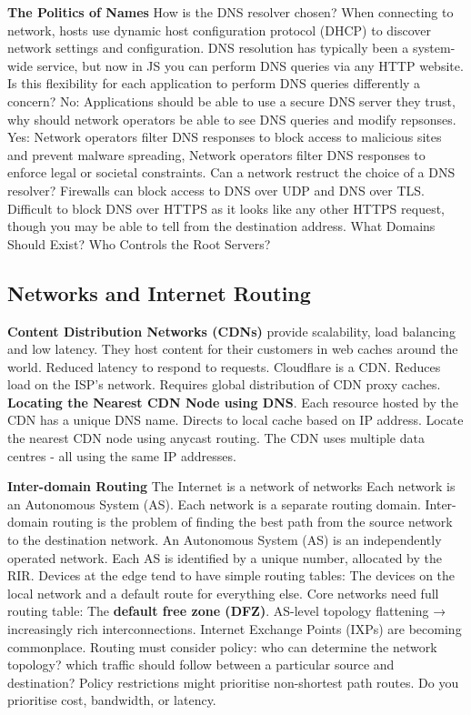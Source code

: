\documentclass{article}
\begin{document}
\vspace{\baselineskip}
\textbf{The Politics of Names}
How is the DNS resolver chosen? When connecting to network, hosts use dynamic host configuration protocol (DHCP)
to discover network settings and configuration.
DNS resolution has typically been a system-wide service, but now in JS you can perform DNS queries via any HTTP website.
Is this flexibility for each application to perform DNS queries differently a concern?
No: Applications should be able to use a secure DNS server they trust, why should network operators be able to see DNS queries and modify repsonses.
Yes: Network operators filter DNS responses to block access to malicious sites and prevent malware spreading,
Network operators filter DNS responses to enforce legal or societal constraints.
Can a network restruct the choice of a DNS resolver?
Firewalls can block access to DNS over UDP and DNS over TLS\@.
Difficult to block DNS over HTTPS as it looks like any other HTTPS request, though you may be able to tell from the destination address.
What Domains Should Exist?
Who Controls the Root Servers?

\clearpage


\subsection*{Networks and Internet Routing}

\textbf{Content Distribution Networks (CDNs)} provide scalability, load balancing and low latency.
They host content for their customers in web caches around the world.
Reduced latency to respond to requests.
Cloudflare is a CDN\@.
Reduces load on the ISP's network.
Requires global distribution of CDN proxy caches.
\textbf{Locating the Nearest CDN Node using DNS}.
Each resource hosted by the CDN has a unique DNS name.
Directs to local cache based on IP address.
Locate the nearest CDN node using anycast routing.
The CDN uses multiple data centres {-} all using the same IP addresses.

\vspace{\baselineskip}
\textbf{Inter-domain Routing}
The Internet is a network of networks
Each network is an Autonomous System (AS).
Each network is a separate routing domain.
Inter-domain routing is the problem of finding the best path from the source network to the destination network.
An Autonomous System (AS) is an independently operated network.
Each AS is identified by a unique number, allocated by the RIR\@.
Devices at the edge tend to have simple routing tables: The devices on the local network and a default route for everything else.
Core networks need full routing table: The \textbf{default free zone (DFZ)}.
AS-level topology flattening → increasingly rich interconnections.
Internet Exchange Points (IXPs) are becoming commonplace.
Routing must consider policy: who can determine the network topology? which traffic should follow between a particular source and destination?
Policy restrictions might prioritise non-shortest path routes. Do you prioritise cost, bandwidth, or latency.
\end{document}
